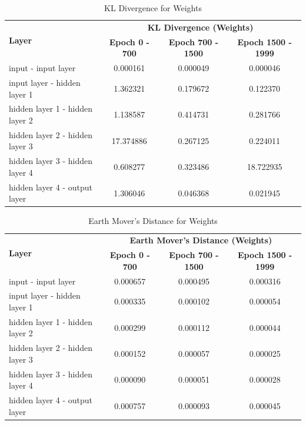 \documentclass{ioereport}
\begin{document}
    \begin{table}[H]
    \centering
    \begin{tabular}{|l|c|c|c|}
    \hline
    \multirow{2}{*}{\textbf{Layer}} & \multicolumn{3}{|c|}{\textbf{KL Divergence (Weights)}} \\
    \cline{2-4}
    & \textbf{Epoch 0 - 700} & \textbf{Epoch 700 - 1500} & \textbf{Epoch 1500 - 1999} \\
    \hline
    input - input layer & 0.000161 & 0.000049 & 0.000046 \\
    input layer - hidden layer 1 & 1.362321 & 0.179672 & 0.122370 \\
    hidden layer 1 - hidden layer 2 & 1.138587 & 0.414731 & 0.281766 \\
    hidden layer 2 - hidden layer 3 & 17.374886 & 0.267125 & 0.224011 \\
    hidden layer 3 - hidden layer 4 & 0.608277 & 0.323486 & 18.722935 \\
    hidden layer 4 - output layer & 1.306046 & 0.046368 & 0.021945 \\
    \hline
    \end{tabular}
    \caption{KL Divergence for Weights}
    \end{table}

    \begin{table}[H]
    \centering
    \begin{tabular}{|l|c|c|c|}
    \hline
    \multirow{2}{*}{\textbf{Layer}} & \multicolumn{3}{|c|}{\textbf{Earth Mover's Distance (Weights)}} \\
    \cline{2-4}
    & \textbf{Epoch 0 - 700} & \textbf{Epoch 700 - 1500} & \textbf{Epoch 1500 - 1999} \\
    \hline
    input - input layer & 0.000657 & 0.000495 & 0.000316 \\
    input layer - hidden layer 1 & 0.000335 & 0.000102 & 0.000054 \\
    hidden layer 1 - hidden layer 2 & 0.000299 & 0.000112 & 0.000044 \\
    hidden layer 2 - hidden layer 3 & 0.000152 & 0.000057 & 0.000025 \\
    hidden layer 3 - hidden layer 4 & 0.000090 & 0.000051 & 0.000028 \\
    hidden layer 4 - output layer & 0.000757 & 0.000093 & 0.000045 \\
    \hline
    \end{tabular}
    \caption{Earth Mover's Distance for Weights}
    \end{table}
\end{document}
